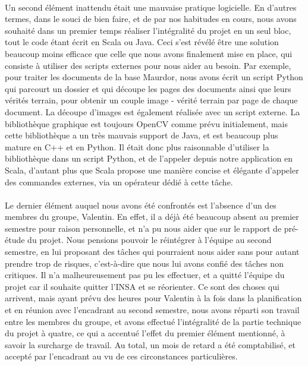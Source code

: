 \paragraph{}
Un second élément inattendu était une mauvaise pratique logicielle. En d'autres termes, dans le souci de bien faire, et de par nos habitudes en cours, nous avons souhaité dans un premier temps réaliser l'intégralité du projet en un seul bloc, tout le code étant écrit en Scala ou Java. Ceci s'est révélé être une solution beaucoup moins efficace que celle que nous avons finalement mise en place, qui consiste à utiliser des scripts externes pour nous aider au besoin. Par exemple, pour traiter les documents de la base Maurdor, nous avons écrit un script Python qui parcourt un dossier et qui découpe les pages des documents ainsi que leurs vérités terrain, pour obtenir un couple image - vérité terrain par page de chaque document. La découpe d'images est également réalisée avec un script externe. La bibliothèque graphique est toujours OpenCV comme prévu initialement, mais cette bibliothèque a un très mauvais support de Java, et est beaucoup plus mature en C++ et en Python. Il était donc plus raisonnable d'utiliser la bibliothèque dans un script Python, et de l'appeler depuis notre application en Scala, d'autant plus que Scala propose une manière concise et élégante d'appeler des commandes externes, via un opérateur dédié à cette tâche.

\paragraph{}
Le dernier élément auquel nous avons été confrontés est l'absence d'un des membres du groupe, Valentin. En effet, il a déjà été beaucoup absent au premier semestre pour raison personnelle, et n'a pu nous aider que sur le rapport de pré-étude du projet. Nous pensions pouvoir le réintégrer à l'équipe au second semestre, en lui proposant des tâches qui pourraient nous aider sans pour autant prendre trop de risques, c'est-à-dire que nous lui avons confié des tâches non critiques. Il n'a malheureusement pas pu les effectuer, et a quitté l'équipe du projet car il souhaite quitter l'INSA et se réorienter. Ce sont des choses qui arrivent, mais ayant prévu des heures pour Valentin à la fois dans la planification et en réunion avec l'encadrant au second semestre, nous avons réparti son travail entre les membres du groupe, et avons effectué l'intégralité de la partie technique du projet à quatre, ce qui a accentué l'effet du premier élément mentionné, à savoir la surcharge de travail. Au total, un mois de retard a été comptabilisé, et accepté par l'encadrant au vu de ces circonstances particulières.

